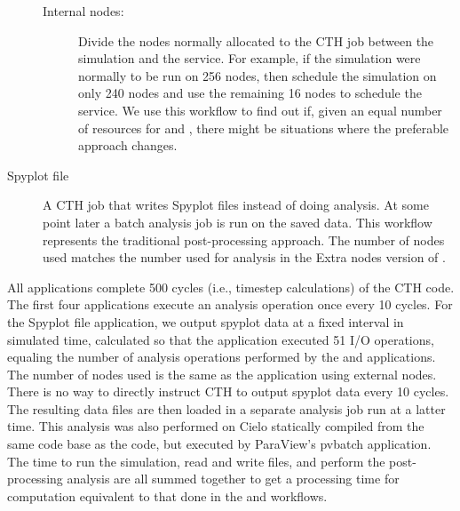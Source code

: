 \begin{description}
\begin{description}
  \item[Internal nodes:] Divide the nodes normally allocated to the CTH job
    between the simulation and the \vda service.  For example, if the
    simulation were normally to be run on 256 nodes, then schedule the
    simulation on only 240 nodes and use the remaining 16 nodes to schedule
    the \vda service.  We use this workflow to find out if, given an equal
    number of resources for \insitu and \intransit, there might be
    situations where the preferable approach changes.
    
  \end{description}

\item [Spyplot file] A CTH job that writes Spyplot files instead of doing
  analysis.  At some point later a batch analysis job is run on the saved
  data.  This workflow represents the traditional post-processing approach.
  The number of nodes used matches the number used for analysis in the Extra
  nodes version of \intransit.

\end{description}

All applications complete 500 cycles (i.e., timestep calculations) of the
CTH code. The first four applications execute an analysis operation once
every 10 cycles.  For the Spyplot file application, we output spyplot data
at a fixed interval in simulated time, calculated so that the application
executed 51 I/O operations, equaling the number of analysis operations
performed by the \insitu and \intransit applications.  The number of nodes
used is the same as the \intransit application using external nodes. There is
no way to directly instruct CTH to output spyplot data every 10 cycles.  The
resulting data files are then loaded in a separate analysis job run at a latter
time.  This analysis was also performed on Cielo statically compiled from the
same code base as the \insitu code, but executed by ParaView's pvbatch
application.  The time to run the simulation, read and write files, and perform
the post-processing analysis are all summed together to get a processing time
for computation equivalent to that done in the \insitu and \intransit
workflows.

